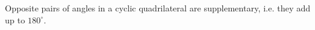 Opposite pairs of angles in a cyclic quadrilateral are supplementary, i.e.
they add up to $180^\circ$.